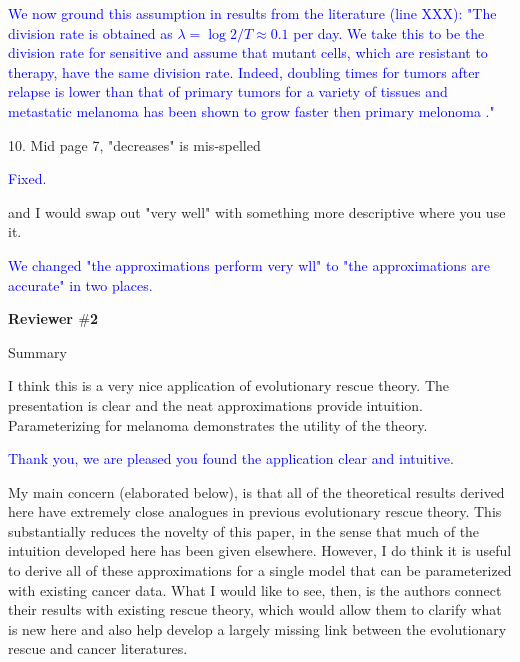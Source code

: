 \documentclass[12pt]{extarticle}
\begin{document}
\textcolor{blue}{ %
We now ground this assumption in results from the literature (line XXX): "The division rate is obtained as $\lambda=\log{2} / T \approx 0.1$ per day. We take this to be the division rate for sensitive and assume that mutant cells, which are resistant to therapy, have the same division rate. Indeed, doubling times for tumors after relapse is lower than that of primary tumors for a variety of tissues \citep{tezuka2007growth,rodgers2024glioblastoma} and metastatic melanoma has been shown to grow faster then primary melonoma \citep{carlson2003tumor}."
} 

10. Mid page 7, "decreases" is mis-spelled 

\textcolor{blue}{%
Fixed. 
} 

and I would swap out "very well" with something more descriptive where you use it.

\textcolor{blue}{
We changed "the approximations perform very wll" to "the approximations are accurate" in two places.
} 

\textbf{Reviewer $\#$2}

Summary


I think this is a very nice application of evolutionary rescue theory. The presentation is clear and the neat approximations provide intuition. Parameterizing for melanoma demonstrates the utility of the theory.

\textcolor{blue}{
Thank you, we are pleased you found the application clear and intuitive.
} 

My main concern (elaborated below), is that all of the theoretical results derived here have extremely close analogues in previous evolutionary rescue theory. This substantially reduces the novelty of this paper, in the sense that much of the intuition developed here has been given elsewhere. However, I do think it is useful to derive all of these approximations for a single model that can be parameterized with existing cancer data. What I would like to see, then, is the authors connect their results with existing rescue theory, which would allow them to clarify what is new here and also help develop a largely missing link between the evolutionary rescue and cancer literatures.
\end{document}
